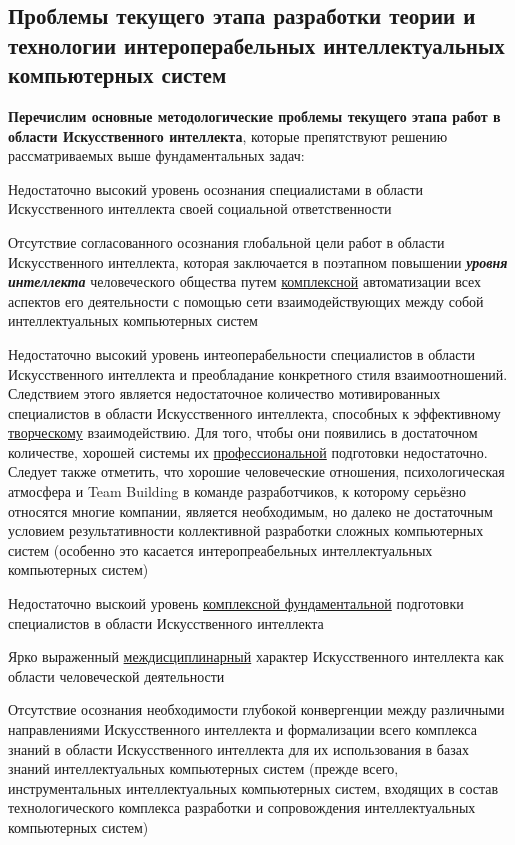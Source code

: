 \subsection*{Проблемы текущего этапа разработки теории и технологии интероперабельных интеллектуальных компьютерных систем}
\textbf{Перечислим основные методологические проблемы текущего этапа работ в области Искусственного интеллекта}, которые препятствуют решению рассматриваемых выше фундаментальных задач:
\begin{textitemize}
	\item 
	Недостаточно высокий уровень осознания специалистами в области Искусственного интеллекта своей социальной ответственности
	\item 
	Отсутствие согласованного осознания глобальной цели работ в области Искусственного интеллекта, которая заключается в поэтапном повышении \textbf{\textit{уровня интеллекта}} человеческого общества путем \uline{комплексной} автоматизации всех аспектов его деятельности с помощью сети взаимодействующих между собой интеллектуальных компьютерных систем
	\item 
	Недостаточно высокий уровень интеоперабельности специалистов в области Искусственного интеллекта и преобладание конкретного стиля взаимоотношений. Следствием этого является недостаточное количество мотивированных специалистов в области Искусственного интеллекта, способных к эффективному \uline{творческому} взаимодействию. Для того, чтобы они появились в достаточном количестве, хорошей системы их \uline{профессиональной} подготовки недостаточно. Следует также отметить, что хорошие человеческие отношения, психологическая атмосфера и Team Building в команде разработчиков, к которому серьёзно относятся многие компании, является необходимым, но далеко не достаточным условием результативности коллективной разработки сложных компьютерных систем (особенно это касается интеропреабельных интеллектуальных компьютерных систем)
	\item 
	Недостаточно выскоий уровень \uline{комплексной фундаментальной} подготовки специалистов в области Искусственного интеллекта
	\item 
	Ярко выраженный \uline{междисциплинарный} характер Искусственного интеллекта как области человеческой деятельности
	\item 
	Отсутствие осознания необходимости глубокой конвергенции между различными направлениями Искусственного интеллекта и формализации всего комплекса знаний в области Искусственного интеллекта для их использования в базах знаний интеллектуальных компьютерных систем (прежде всего, инструментальных интеллектуальных компьютерных систем, входящих в состав технологического комплекса разработки и сопровождения интеллектуальных компьютерных систем)

\end{textitemize}
